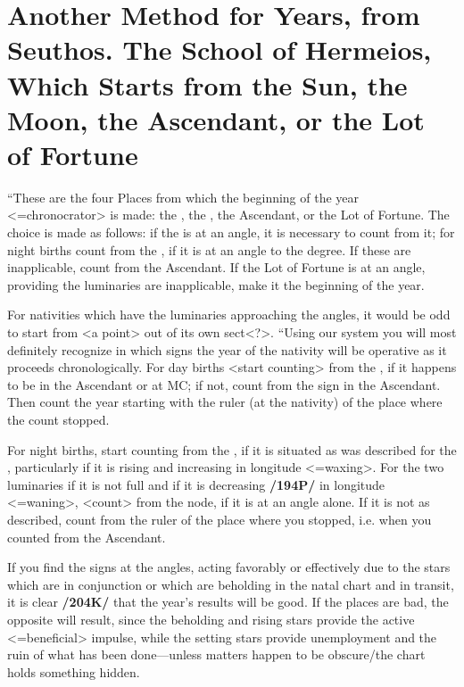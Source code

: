 \section{Another Method for Years, from Seuthos. The School of Hermeios, Which Starts from the Sun, the Moon, the Ascendant, or the Lot of Fortune}

“These are the four Places from which the beginning of the year <=chronocrator> is made: the \Sun, the \Moon, the Ascendant, or the Lot of Fortune. The choice is made as follows: if the \Sun\xspace is at an angle, it is necessary to count from it; for night births count from the \Moon, if it is at an angle to the degree. If these are inapplicable, count from the Ascendant. If the Lot of Fortune is at an angle, providing the luminaries are inapplicable, make it the beginning of the year. 

For nativities which have the luminaries approaching the angles, it would be odd to start from <a point> out of its own sect<?>. “Using our system you will most definitely recognize in which signs the year of the nativity will be
operative as it proceeds chronologically. For day births <start counting> from the \Sun, if it happens to be
in the Ascendant or at MC; if not, count from the sign in the Ascendant. Then count the year starting with the ruler (at the nativity) of the place where the count stopped. 

For night births, start counting from the \Moon, if it is situated as was described for the \Sun, particularly if it is rising and increasing in longitude <=waxing>. For the two luminaries if it is not full and if it is decreasing \textbf{/194P/} in longitude <=waning>, <count> from the node, if it is at an angle alone. If it is not as described, count from the ruler of the place where you stopped, i.e. when you counted from the Ascendant. 

If you find the signs at the angles, acting favorably or effectively due to the stars which are in conjunction or which are beholding in the natal chart and in transit, it is clear \textbf{/204K/} that the year’s results will be good. If the places are bad, the opposite will result, since the beholding and rising stars provide the active <=beneficial> impulse,
while the setting stars provide unemployment and the ruin of what has been done—unless matters happen to be obscure/the chart holds something hidden.

\newpage